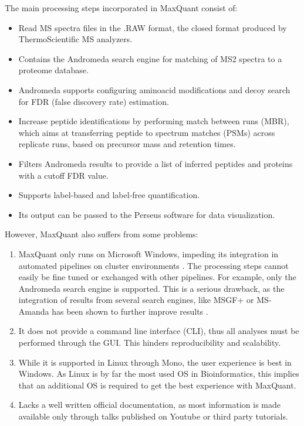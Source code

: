 \documentclass[11pt, a4paper]{report}
\begin{document}
The main processing steps incorporated in MaxQuant consist of:

\begin{itemize}

\item Read MS spectra files in the .RAW format, the closed format produced by ThermoScientific MS analyzers.

\item Contains the Andromeda search engine \cite{Cox2011} for matching of \ac{MS2} spectra to a proteome database.

\item Andromeda supports configuring aminoacid modifications and decoy search for FDR (false discovery rate) estimation.

\item Increase peptide identifications by performing match between runs (MBR), which aims at transferring peptide to spectrum matches (PSMs) across replicate runs, based on precursor mass and retention times.

\item Filters Andromeda results to provide a list of inferred peptides and proteins with a cutoff FDR value.

\item Supports label-based and label-free quantification.

\item Its output can be passed to the Perseus software for data visualization. %

\end{itemize}

However, MaxQuant also suffers from some problems:

\begin{enumerate}

\item MaxQuant only runs on Microsoft Windows, impeding its integration in automated pipelines on cluster environments \cite{Argentini2016}. The processing steps cannot easily be fine tuned or exchanged with other pipelines. For example, only the Andromeda search engine is supported. This is a serious drawback, as the integration of results from several search engines, like MSGF+ \cite{Kim2014} or MS-Amanda \cite{Dorfer2014}  has been shown to further improve results \cite{Shteynberg2013}.

\item It does not provide a command line interface (CLI), thus all analyses must be performed through the GUI. This hinders reproducibility and scalability.

\item While it is supported in Linux through Mono, the user experience is best in Windows. As Linux is by far the most used OS in Bioinformatics, this implies that an additional OS is required to get the best experience with MaxQuant.

\item Lacks a well written official documentation, as most information is made available only through talks published on Youtube or third party tutorials.

\end{enumerate}
\end{document}
